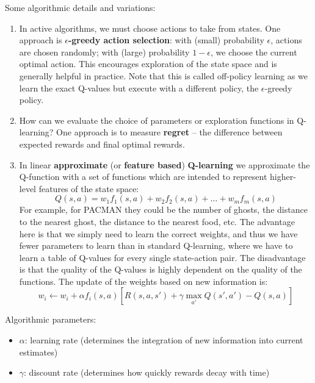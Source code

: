\documentclass[a4paper]{article}
\begin{document}
\newpage
\noindent Some algorithmic details and variations:
\begin{enumerate}
    \item In active algorithms, we must choose actions to take from states. One approach is \textbf{$\epsilon$-greedy action selection}: with (small) probability $\epsilon$, actions are chosen randomly; with (large) probability $1 - \epsilon$, we choose the current optimal action. This encourages exploration of the state space and is generally helpful in practice. Note that this is called off-policy learning as we learn the exact Q-values but execute with a different policy, the $\epsilon$-greedy policy.
    \item How can we evaluate the choice of parameters or exploration functions in Q-learning? One approach is to measure \textbf{regret} -- the difference between expected rewards and final optimal rewards.
    \item In linear \textbf{approximate} (or \textbf{feature based}) \textbf{Q-learning} we approximate the Q-function with a set of functions which are intended to represent higher-level features of the state space: 
    \[
    Q(s,a) = w_1 f_1(s,a) + w_2 f_2(s,a) + \dots + w_m f_m(s,a)
    \]
    For example, for PACMAN they could be the number of ghosts, the distance to the nearest ghost, the distance to the nearest food, etc. The advantage here is that we simply need to learn the correct weights, and thus we have fewer parameters to learn than in standard Q-learning, where we have to learn a table of Q-values for every single state-action pair. The disadvantage is that the quality of the Q-values is highly dependent on the quality of the functions. The update of the weights based on new information is:
    \[
    w_i \leftarrow w_i + \alpha f_i(s,a) [R(s, a, s') + \gamma \max_{a'} Q(s', a') - Q(s, a)]
    \]
    
\end{enumerate}

\noindent Algorithmic parameters:
\begin{itemize}
    \item $\alpha$: learning rate (determines the integration of new information into current estimates)
    \item $\gamma$: discount rate (determines how quickly rewards decay with time)
\end{itemize}
\end{document}
